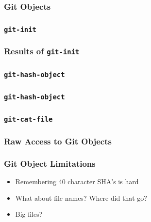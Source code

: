 \documentclass{beamer}
\begin{document}
\begin{frame}
\frametitle{Git Objects}
\begin{figure}
\end{figure}
\end{frame}

\begin{frame}[fragile]
\frametitle{\texttt{git-init}}

\end{frame}

\begin{frame}[fragile]
\frametitle{Results of \texttt{git-init}}

\end{frame}

\begin{frame}[fragile]
\frametitle{\texttt{git-hash-object}}

\end{frame}

\begin{frame}[fragile]
\frametitle{\texttt{git-hash-object}}

\end{frame}

\begin{frame}[fragile]
\frametitle{\texttt{git-cat-file}}

\end{frame}

\begin{frame}[fragile]
\frametitle{Raw Access to Git Objects}

\end{frame}

\begin{frame}
\frametitle{Git Object Limitations}
\begin{itemize}
\item{Remembering 40 character SHA's is hard}
\item{What about file names? Where did that go?}
\item{Big files?}
\end{itemize}
\end{frame}
\end{document}
